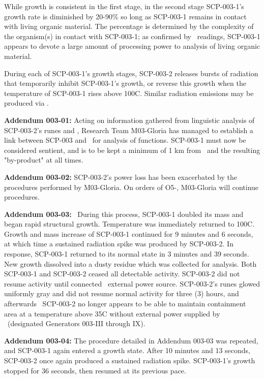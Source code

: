 While growth is consistent in the first stage, in the second stage SCP-003-1's growth rate is diminished by 20-90\% so long as SCP-003-1 remains in contact with living organic material. The percentage is determined by the complexity of the organism(s) in contact with SCP-003-1; as confirmed by \redacted \ readings, SCP-003-1 appears to devote a large amount of processing power to analysis of living organic material.

During each of SCP-003-1's growth stages, SCP-003-2 releases bursts of radiation that temporarily inhibit SCP-003-1's growth, or reverse this growth when the temperature of SCP-003-1 rises above 100\degree C. Similar radiation emissions may be produced via \expunged.

\textbf{Addendum 003-01:} Acting on information gathered from linguistic analysis of SCP-003-2's runes and \expunged, Research Team M03-Gloria has managed to establish a link between SCP-003 and \expunged \ for analysis of functions. SCP-003-1 must now be considered sentient, and is to be kept a minimum of 1 km from \expunged \ and the resulting "by-product" at all times.

\textbf{Addendum 003-02:} SCP-003-2's power loss has been exacerbated by the procedures performed by M03-Gloria. On orders of O5-, M03-Gloria will continue procedures.

\textbf{Addendum 003-03:} \expunged \ During this process, SCP-003-1 doubled its mass and began rapid structural growth. Temperature was immediately returned to 100\degree C. Growth and mass increase of SCP-003-1 continued for 9 minutes and 6 seconds, at which time a sustained radiation spike was produced by SCP-003-2. In response, SCP-003-1 returned to its normal state in 3 minutes and 39 seconds. New growth dissolved into a dusty residue which was collected for analysis. Both SCP-003-1 and SCP-003-2 ceased all detectable activity. SCP-003-2 did not resume activity until connected \redacted \ external power source. SCP-003-2's runes glowed uniformly gray and did not resume normal activity for three (3) hours, and afterwards \expunged \ SCP-003-2 no longer appears to be able to maintain containment area at a temperature above 35\degree C without external power supplied by \redacted \ (designated Generators 003-III through IX).

\textbf{Addendum 003-04:} The procedure detailed in Addendum 003-03 was repeated, and SCP-003-1 again entered a growth state. After 10 minutes and 13 seconds, SCP-003-2 once again produced a sustained radiation spike. SCP-003-1's growth stopped for 36 seconds, then resumed at its previous pace.

